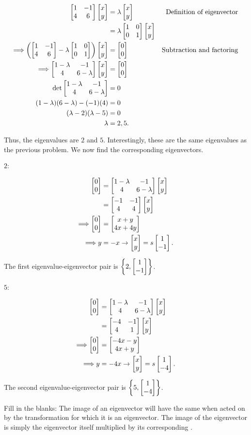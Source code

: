 \documentclass[../gatm_answers.tex]{subfiles}
\begin{document}
\begin{align*}
\begin{bmatrix} 1 & -1 \\ 4 & 6 \end{bmatrix}\begin{bmatrix} x \\ y \end{bmatrix} &= \lambda\begin{bmatrix} x \\ y \end{bmatrix} & \text{Definition of eigenvector} \\
&= \lambda\begin{bmatrix} 1 & 0 \\ 0 & 1 \end{bmatrix}\begin{bmatrix} x \\ y \end{bmatrix} \\
\Longrightarrow \left(\begin{bmatrix} 1 & -1 \\ 4 & 6 \end{bmatrix}-\lambda\begin{bmatrix} 1 & 0 \\ 0 & 1 \end{bmatrix}\right)\begin{bmatrix} x \\ y \end{bmatrix}&=\begin{bmatrix} 0 \\ 0 \end{bmatrix} & \text{Subtraction and factoring} \\
\Longrightarrow \begin{bmatrix} 1-\lambda & -1 \\ 4 & 6-\lambda \end{bmatrix}\begin{bmatrix} x \\ y \end{bmatrix} &= \begin{bmatrix} 0 \\ 0 \end{bmatrix} \\
\det \begin{bmatrix} 1-\lambda & -1 \\ 4 & 6-\lambda \end{bmatrix} &= 0 \\
(1-\lambda)(6-\lambda)-(-1)(4) &= 0 \\
(\lambda-2)(\lambda-5) &= 0 \\
\lambda &= 2,5.\\
\end{align*}

Thus, the eigenvalues are $2$ and $5$. Interestingly, these are the same eigenvalues as the previous problem. We now find the corresponding eigenvectors.

$2$:

\begin{align*}
\begin{bmatrix} 0 \\ 0 \end{bmatrix} &= \begin{bmatrix} 1-\lambda & -1 \\ 4 & 6-\lambda \end{bmatrix}\begin{bmatrix} x \\ y \end{bmatrix} \\
&= \begin{bmatrix} -1 & -1 \\ 4 & 4 \end{bmatrix}\begin{bmatrix} x \\ y \end{bmatrix} \\
\Longrightarrow \begin{bmatrix} 0 \\ 0 \end{bmatrix} &= \begin{bmatrix} x+y \\ 4x+4y \end{bmatrix} \\
\Longrightarrow y&=-x \rightarrow \begin{bmatrix} x \\ y \end{bmatrix}=s\begin{bmatrix} 1 \\ -1 \end{bmatrix}.
\end{align*}

The first eigenvalue-eigenvector pair is $\left\{2, \begin{bmatrix} 1 \\ -1 \end{bmatrix}\right\}$.

$5$:

\begin{align*}
\begin{bmatrix} 0 \\ 0 \end{bmatrix} &= \begin{bmatrix} 1-\lambda & -1 \\ 4 & 6-\lambda \end{bmatrix}\begin{bmatrix} x \\ y \end{bmatrix} \\
&= \begin{bmatrix} -4 & -1 \\ 4 & 1 \end{bmatrix}\begin{bmatrix} x \\ y \end{bmatrix} \\
\Longrightarrow \begin{bmatrix} 0 \\ 0 \end{bmatrix} &= \begin{bmatrix} -4x-y \\ 4x+y \end{bmatrix} \\
\Longrightarrow y&=-4x \rightarrow \begin{bmatrix} x \\ y \end{bmatrix}=s\begin{bmatrix} 1 \\ -4 \end{bmatrix}.
\end{align*}

The second eigenvalue-eigenvector pair is $\left\{5, \begin{bmatrix} 1 \\ -4 \end{bmatrix}\right\}$.

\begin{outer_problem}
\item Fill in the blanks: The image of an eigenvector will have the same \underline{\phantom{00000}} when acted on by the transformation \underline{\phantom{00000}} for which it is an eigenvector. The image of the eigenvector is simply the eigenvector itself multiplied by its corresponding \underline{\phantom{00000}}.
\end{outer_problem}
\end{document}
